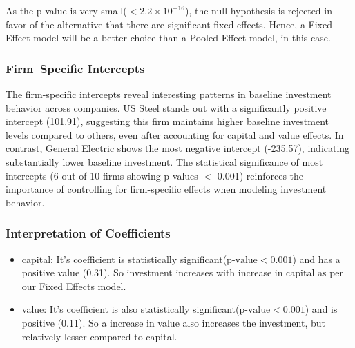\documentclass[a4paper]{article}
\begin{document}
As the p-value is very small(\(<2.2\times10^{-16}\)), the null hypothesis is rejected in favor of the alternative that there are significant fixed effects. Hence, a Fixed Effect model will be a better choice than a Pooled Effect model, in this case.


\subsubsection*{\textbf{Firm--Specific Intercepts}}
The firm-specific intercepts reveal interesting patterns in baseline investment behavior across companies. US Steel stands out with a significantly positive intercept (101.91), suggesting this firm maintains higher baseline investment levels compared to others, even after accounting for capital and value effects. In contrast, General Electric shows the most negative intercept (-235.57), indicating substantially lower baseline investment. The statistical significance of most intercepts (6 out of 10 firms showing p-values \(<\) 0.001) reinforces the importance of controlling for firm-specific effects when modeling investment behavior.

\subsubsection*{\textbf{Interpretation of Coefficients}}
\begin{itemize}
    \item capital:  It's coefficient is statistically significant(\(\text{p-value}<0.001\)) and has a positive value (0.31). So investment increases with increase in capital as per our Fixed Effects model.
    
    \item value: It's coefficient is also statistically significant(\(\text{p-value}<0.001\)) and is positive (0.11). So a increase in value also increases the investment, but relatively lesser compared to capital. 

\end{itemize}


\end{document}
